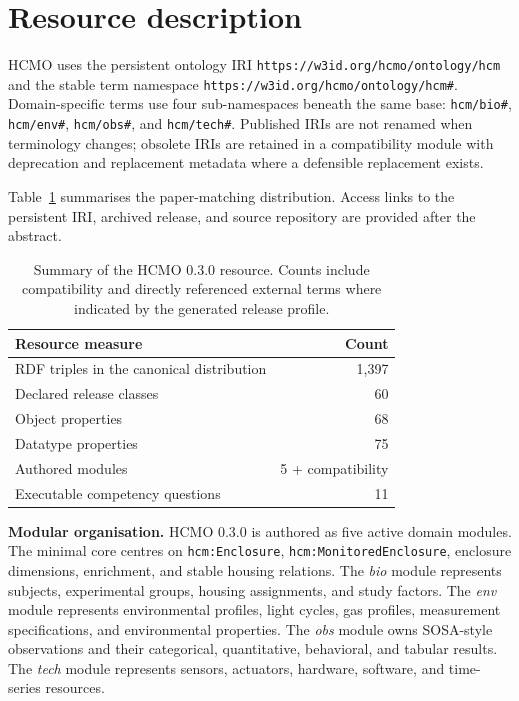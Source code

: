 \section{Resource description}
HCMO uses the persistent ontology IRI \nolinkurl{https://w3id.org/hcmo/ontology/hcm} and the stable term namespace \nolinkurl{https://w3id.org/hcmo/ontology/hcm#}. Domain-specific terms use four sub-namespaces beneath the same base: \nolinkurl{hcm/bio#}, \nolinkurl{hcm/env#}, \nolinkurl{hcm/obs#}, and \nolinkurl{hcm/tech#}. Published IRIs are not renamed when terminology changes; obsolete IRIs are retained in a compatibility module with deprecation and replacement metadata where a defensible replacement exists.

Table~\ref{tab:resource-stats} summarises the paper-matching distribution. Access links to the persistent IRI, archived release, and source repository are provided after the abstract.

\begin{table}[h]
\centering
\small
\caption{Summary of the HCMO 0.3.0 resource. Counts include compatibility and directly referenced external terms where indicated by the generated release profile.}
\label{tab:resource-stats}
\begin{tabular}{@{}lr@{}}
\toprule
Resource measure & Count \\
\midrule
RDF triples in the canonical distribution & 1,397 \\
Declared release classes & 60 \\
Object properties & 68 \\
Datatype properties & 75 \\
Authored modules & 5 + compatibility \\
Executable competency questions & 11 \\
\bottomrule
\end{tabular}
\end{table}

\textbf{Modular organisation.} HCMO 0.3.0 is authored as five active domain modules. The minimal core centres on \nolinkurl{hcm:Enclosure}, \nolinkurl{hcm:MonitoredEnclosure}, enclosure dimensions, enrichment, and stable housing relations. The \emph{bio} module represents subjects, experimental groups, housing assignments, and study factors. The \emph{env} module represents environmental profiles, light cycles, gas profiles, measurement specifications, and environmental properties. The \emph{obs} module owns SOSA-style observations and their categorical, quantitative, behavioral, and tabular results. The \emph{tech} module represents sensors, actuators, hardware, software, and time-series resources. 

